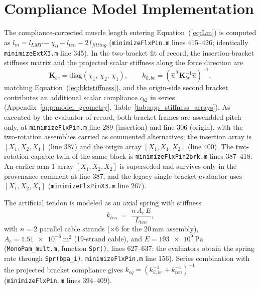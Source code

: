 \section{Compliance Model Implementation}

The compliance-corrected muscle length entering Equation~(\ref{eq:Lm}) is computed as $l_{m} = l_{LMT} - \chi_{0} - l_{ten} - 2\,l_{fitting}$ (\texttt{minimizeFlxPin.m} lines 415--426; identically \texttt{minimizeExtX3.m} line 345). In the two-bracket fit of record, the insertion-bracket stiffness matrix and the projected scalar stiffness along the force direction are
\begin{equation}
    \mathbf{K}_{br} = \mathrm{diag}(\chi_{1},\,\chi_{2},\,\chi_{1}),
    \qquad
    k_{\hat{u},br} = \left(\hat{u}^{\,T}\mathbf{K}_{br}^{-1}\hat{u}\right)^{-1},
    \label{eq:app_kbr}
\end{equation}
matching Equation~(\ref{eq:bktstiffness}), and the origin-side second bracket contributes an additional scalar compliance $c_{b2}$ in series (Appendix~\ref{app:model_geometry}, Table~\ref{tab:app_stiffness_arrays}). As executed by the evaluator of record, both bracket frames are assembled pitch-only, at \texttt{minimizeFlxPin.m} line 289 (insertion) and line 306 (origin), with the two-rotation assemblies carried as commented alternatives; the insertion array is $[X_{1},X_{2},X_{1}]$ (line 387) and the origin array $[X_{1},X_{1},X_{2}]$ (line 400). The two-rotation-capable twin of the same block is \texttt{minimizeFlxPin2brk.m} lines 387--418. An earlier arm-1 array $[X_{1},X_{2},X_{2}]$ is superseded and survives only in the provenance comment at line 387, and the legacy single-bracket evaluator uses $[X_{1},X_{2},X_{1}]$ (\texttt{minimizeFlxPinX3.m} line 267).

The artificial tendon is modeled as an axial spring with stiffness
\begin{equation}
    k_{ten} \;=\; \frac{n\,A_{c}\,E}{L_{ten}},
    \label{eq:app_tendon}
\end{equation}
with $n=2$ parallel cable strands ($\times 6$ for the 20\,mm assembly), $A_{c} = \qty{1.51e-6}{\metre\squared}$ (19-strand cable), and $E = \qty{193e9}{\pascal}$ (\texttt{MonoPam\_mult.m}, function \texttt{Spr()}, lines 627--637; the evaluators obtain the spring rate through \texttt{Spr(bpa\_i)}, \texttt{minimizeFlxPin.m} line 156). Series combination with the projected bracket compliance gives $k_{eq} = \left(k_{\hat{u},br}^{-1} + k_{ten}^{-1}\right)^{-1}$ (\texttt{minimizeFlxPin.m} lines 394--409).

